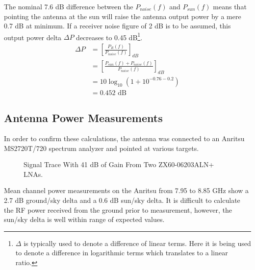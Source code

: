 \documentclass[titlepage]{article}
\begin{document}
The nominal 7.6 dB difference between the $P_{noise}(f)$ and $P_{sun}(f)$ means that pointing the antenna at the sun will raise the antenna output power by a mere 0.7 dB at minimum. If a receiver noise figure of 2 dB is to be assumed, this output power delta $\Delta P$ decreases to 0.45 dB\footnote{$\Delta$ is typically used to denote a difference of linear terms. Here it is being used to denote a difference in logarithmic terms which translates to a linear ratio.}.
\begin{align*}
    \Delta P &= \left[ \frac{P_{R}(f)}{P_{noise}(f)} \right] _{dB}\\
             &= \left[ \frac{P_{sun}(f)+P_{noise}(f)}{P_{noise}(f)} \right] _{dB}\\
             &= 10 \log_{10} \left( 1 + 10^{-0.76 - 0.2} \right)\\
             &= 0.452 \text{ dB}
\end{align*}


\subsection{Antenna Power Measurements}
\label{sec:pwrplots}
In order to confirm these calculations, the antenna was connected to an Anritsu MS2720T/720 spectrum analyzer and pointed at various targets.
\begin{figure}[H]
\begin {center}
\caption{Signal Trace With 41 dB of Gain From Two ZX60-06203ALN+ LNAs.}\label{fig:specan1}
\end {center}
\end{figure}
Mean channel power measurements on the Anritsu from 7.95 to 8.85 GHz show a 2.7 dB ground/sky delta and a 0.6 dB sun/sky delta. It is difficult to calculate the RF power received from the ground prior to measurement, however, the sun/sky delta is well within range of expected values.
\end{document}
